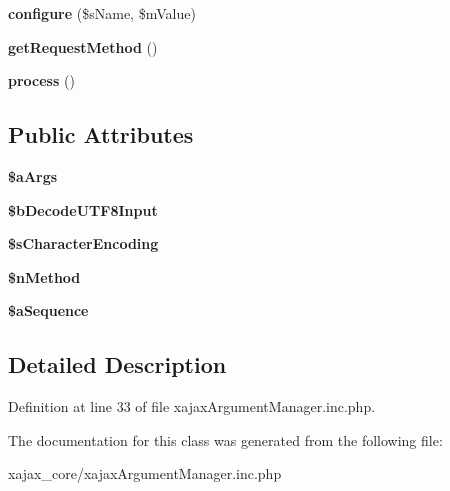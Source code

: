 \begin{DoxyCompactItemize}
\item 
\hypertarget{classxajaxArgumentManager_a9c9ea3e6230c3448637927ef6e7e3732}{
{\bfseries configure} (\$sName, \$mValue)}
\label{classxajaxArgumentManager_a9c9ea3e6230c3448637927ef6e7e3732}

\item 
\hypertarget{classxajaxArgumentManager_a05b1f5a0e92fe1ee63107f5283245d25}{
{\bfseries getRequestMethod} ()}
\label{classxajaxArgumentManager_a05b1f5a0e92fe1ee63107f5283245d25}

\item 
\hypertarget{classxajaxArgumentManager_ad223d1e7b024603fb6c4d66b5b356450}{
{\bfseries process} ()}
\label{classxajaxArgumentManager_ad223d1e7b024603fb6c4d66b5b356450}

\end{DoxyCompactItemize}
\subsection*{Public Attributes}
\begin{DoxyCompactItemize}
\item 
\hypertarget{classxajaxArgumentManager_a282b9b5e02f130fbfc0c039e3b712aa2}{
{\bfseries \$aArgs}}
\label{classxajaxArgumentManager_a282b9b5e02f130fbfc0c039e3b712aa2}

\item 
\hypertarget{classxajaxArgumentManager_adaa50a9005a8e07b85023b6a91cc17a5}{
{\bfseries \$bDecodeUTF8Input}}
\label{classxajaxArgumentManager_adaa50a9005a8e07b85023b6a91cc17a5}

\item 
\hypertarget{classxajaxArgumentManager_a042707f46ac6e5778c90b57a08470f66}{
{\bfseries \$sCharacterEncoding}}
\label{classxajaxArgumentManager_a042707f46ac6e5778c90b57a08470f66}

\item 
\hypertarget{classxajaxArgumentManager_a0fc8ae73459f98b4961ac63002bf174c}{
{\bfseries \$nMethod}}
\label{classxajaxArgumentManager_a0fc8ae73459f98b4961ac63002bf174c}

\item 
\hypertarget{classxajaxArgumentManager_ade98d847a06e10dcfb611f2300970be4}{
{\bfseries \$aSequence}}
\label{classxajaxArgumentManager_ade98d847a06e10dcfb611f2300970be4}

\end{DoxyCompactItemize}


\subsection{Detailed Description}


Definition at line 33 of file xajaxArgumentManager.inc.php.



The documentation for this class was generated from the following file:\begin{DoxyCompactItemize}
\item 
xajax\_\-core/xajaxArgumentManager.inc.php\end{DoxyCompactItemize}
